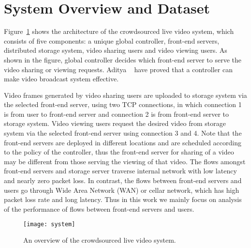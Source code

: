
\section{System Overview and Dataset}
\label{sec:system}



Figure~\ref{fig:system} shows the architecture of the crowdsourced live video system, which consists of five components: a unique global controller, front-end servers, distributed storage system, video sharing users and video viewing users. As shown in the figure, global controller decides which front-end server to serve the video sharing or viewing requests. Aditya \etal ~\cite{ganjam2015c3} have proved that a controller can make video broadcast system effective.

Video frames generated by video sharing users are uploaded to storage system via the selected front-end server, using two TCP connections, in which connection 1 is from user to front-end server and connection 2 is from front-end server to storage system. Video viewing users request the desired video from storage system via the selected front-end server using connection 3 and 4. Note that the front-end servers are deployed in different locations and are scheduled according to the policy of the controller, thus the front-end server for sharing of a video may be different from those serving the viewing of that video. The flows amongst front-end servers and storage server traverse internal network with low latency and nearly zero packet loss. In contrast, the flows between front-end servers and users go through Wide Area Network (WAN) or cellar network, which has high packet loss rate and long latency. Thus in this work we mainly focus on analysis of the performance of flows between front-end servers and users.

\begin{figure}[ht]
	\centering
	\texttt{[image: system]}
	\caption{An overview of the crowdsourced live video system.}
	\label{fig:system} 
	\termspace
\end{figure}

